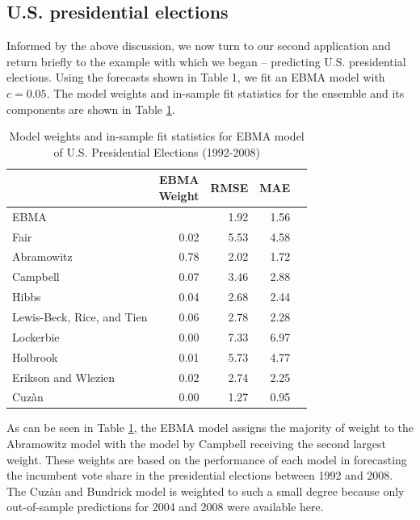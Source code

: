 \documentclass[12pt,fullpage,endnotes]{article}
\begin{document}
\subsection{U.S. presidential elections}

Informed by the above discussion, we now turn to our second
application and return briefly to the example with which we began --
predicting U.S. presidential elections.  Using the forecasts shown in
Table 1, we fit an EBMA model with $c=0.05$.  The model weights and
in-sample fit statistics for the ensemble and its components are shown
in Table \ref{presModel}.


\begin{table}[ht]
\caption{Model weights and in-sample fit statistics for EBMA model of U.S. Presidential Elections (1992-2008)}
\label{presModel}
\begin{center}
\begin{tabular}{lrrrr}
  \toprule
 & \shortstack{EBMA\\ Weight}&RMSE &MAE \\ 
  \midrule
EBMA &  & 1.92 & 1.56 \\ 
  Fair & 0.02 & 5.53 & 4.58 \\ 
  Abramowitz & 0.78 & 2.02 & 1.72 \\ 
  Campbell  & 0.07 & 3.46 & 2.88 \\ 
  Hibbs  & 0.04 & 2.68 & 2.44 \\ 
  Lewis-Beck, Rice, and Tien & 0.06 & 2.78 & 2.28 \\ 
  Lockerbie  & 0.00 & 7.33 & 6.97 \\ 
 Holbrook & 0.01 & 5.73 & 4.77 \\ 
  Erikson and Wlezien & 0.02 & 2.74 & 2.25 \\ 
  Cuz\`an & 0.00 & 1.27 & 0.95 \\ 
   \bottomrule
\end{tabular}
\end{center}
\end{table}

As can be seen in Table \ref{presModel}, the EBMA model assigns the
majority of weight to the Abramowitz model with the model by Campbell
receiving the second largest weight. These weights are based on the
performance of each model in forecasting the incumbent vote share in
the presidential elections between 1992 and 2008. The Cuz\`an and
Bundrick model is weighted to such a small degree because only
out-of-sample predictions for 2004 and 2008 were available here.
\end{document}
